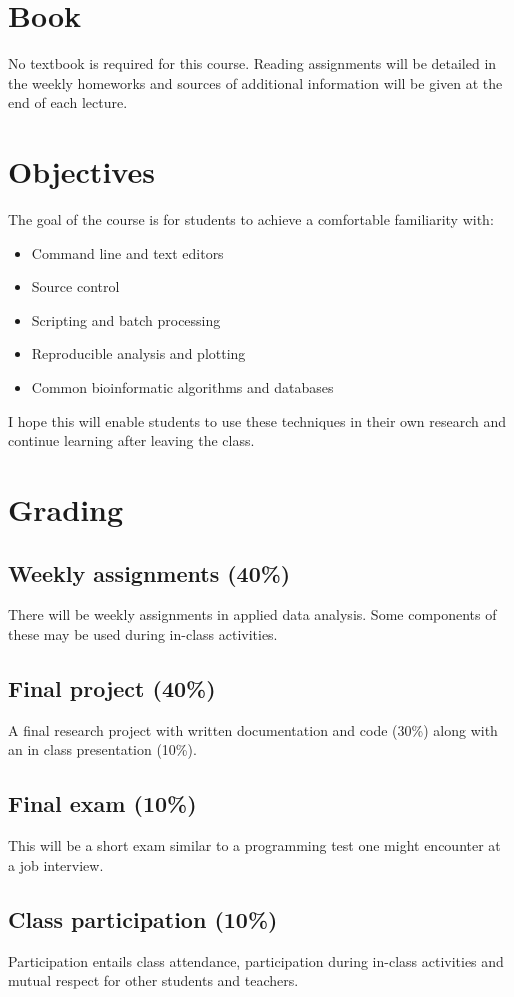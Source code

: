 \documentclass[12pt]{article}
\begin{document}
\section*{Book}
No textbook is required for this course. Reading assignments will be detailed in the weekly homeworks and sources of additional information will be given at the end of each lecture.

\newpage

\section*{Objectives}
The goal of the course is for students to achieve a comfortable familiarity with:
\begin{itemize}
	\item Command line and text editors
	\item Source control
	\item Scripting and batch processing
	\item Reproducible analysis and plotting 
	\item Common bioinformatic algorithms and databases
\end{itemize}
I hope this will enable students to use these techniques in their own research and continue learning after leaving the class.

\section*{Grading}
\subsection*{Weekly assignments (40\%)}
There will be weekly assignments in applied data analysis. Some components of these may be used during in-class activities.
\subsection*{Final project (40\%)}
A final research project with written documentation and code (30\%) along with an in class presentation (10\%).
\subsection*{Final exam (10\%)}
This will be a short exam similar to a programming test one might encounter at a job interview.
\subsection*{Class participation (10\%)}
Participation entails class attendance, participation during in-class activities and mutual respect for other students and teachers.
\end{document}
